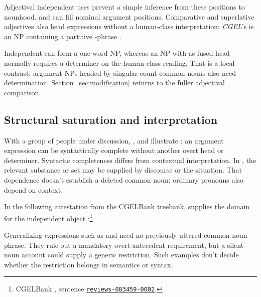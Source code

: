 \documentclass[12pt]{article}
\begin{document}
Adjectival independent uses prevent a simple inference from these positions to nounhood.  and  can fill nominal argument positions. Comparative and superlative adjectives also head expressions without a human-class interpretation: \textit{CGEL}'s  is an NP containing a partitive -phrase \citep[332--333, 416--423]{huddleston2002}.

Independent  can form a one-word NP, whereas an NP with  as fused head normally requires a determiner on the human-class reading. That is a local contrast: argument NPs headed by singular count common nouns also need determination. Section~\ref{sec:modification} returns to the fuller adjectival comparison.

\subsection{Structural saturation and interpretation}

With a group of people under discussion, ,  and  illustrate : an argument expression can be syntactically complete without another overt head or determiner. Syntactic completeness differs from contextual interpretation. In , the relevant substance or set may be supplied by discourse or the situation. That dependence doesn't establish a deleted common noun: ordinary pronouns also depend on context.

In the following attestation from the CGELBank treebank,  supplies the domain for the independent object :\footnote{CGELBank \citep{reynolds2023unified}, sentence \href{https://github.com/nert-nlp/cgel/blob/d0a2c2d8c522b23d5aa879fc9cb94948f4285b2c/datasets/ewt.cgel\#L651-L654}{\nolinkurl{reviews-083459-0002}}.}
\ea\label{ex:attested-both}
\z

Generalizing expressions such as  and  need no previously uttered common-noun phrase. They rule out a mandatory overt-antecedent requirement, but a silent-noun account could supply a generic restriction. Such examples don't decide whether the restriction belongs in semantics or syntax.
\end{document}

